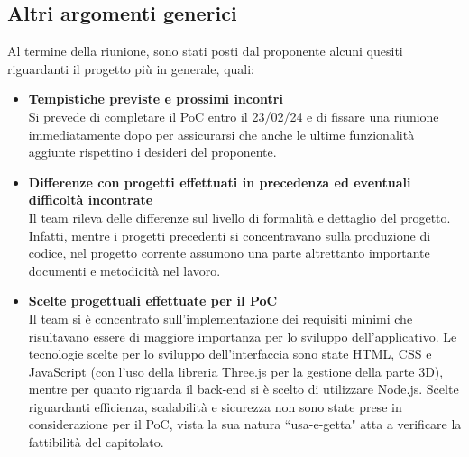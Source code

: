 \subsection{Altri argomenti generici} \label{sec:argomenti:altri}
    Al termine della riunione, sono stati posti dal proponente alcuni quesiti riguardanti il progetto più in generale, quali:
    \begin{itemize}
        \item \textbf{Tempistiche previste e prossimi incontri}\\
        Si prevede di completare il PoC entro il 23/02/24 e di fissare una riunione immediatamente dopo per assicurarsi che anche le ultime funzionalità aggiunte rispettino i desideri del proponente.
        \item \textbf{Differenze con progetti effettuati in precedenza ed eventuali difficoltà incontrate}\\
        Il team rileva delle differenze sul livello di formalità e dettaglio del progetto. Infatti, mentre i progetti precedenti si concentravano sulla produzione di codice, nel progetto corrente assumono una parte altrettanto importante documenti e metodicità nel lavoro.
        \item \textbf{Scelte progettuali effettuate per il PoC}\\
        Il team si è concentrato sull'implementazione dei requisiti minimi che risultavano essere di maggiore importanza per lo sviluppo dell'applicativo. Le tecnologie scelte per lo sviluppo dell'interfaccia sono state HTML, CSS e JavaScript (con l'uso della libreria Three.js per la gestione della parte 3D), mentre per quanto riguarda il back-end si è scelto di utilizzare Node.js. Scelte riguardanti efficienza, scalabilità e sicurezza non sono state prese in considerazione per il PoC, vista la sua natura ``usa-e-getta" atta a verificare la fattibilità del capitolato.
    \end{itemize}